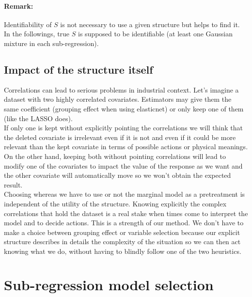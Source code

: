 \documentclass[12pt,a4paper]{report}
\begin{document}
	
\paragraph{Remark:} Identifiability of $S$ is not necessary to use a given structure but helps to find it.
In the followings, true $S$ is supposed to be identifiable (at least one Gaussian mixture in each sub-regression).
		
	\subsection{Impact of the structure itself}
		
	
	Correlations can lead to serious problems in industrial context. Let's imagine a dataset with two highly correlated covariates. Estimators may give them the same coefficient (grouping effect  when using elasticnet) or only keep one of them (like the LASSO does). \\
	
	If only one is kept without explicitly pointing the correlations we will think that the deleted covariate is irrelevant even if it is not and even if it could be more relevant than the kept covariate in terms of possible actions or physical meanings.\\
	
	 On the other hand, keeping both without pointing correlations will lead to modify one of the covariates to impact the value of the response as we want and the other covariate will automatically move so we won't obtain the expected result.\\
	 
	  Choosing whereas we have to use or not the marginal model as a pretreatment is independent of the utility of the structure. Knowing explicitly the complex correlations that hold the dataset is a real stake when times come to interpret the model and to  decide actions. This is a strength of our method. We don't have to make a choice between grouping effect or variable selection because our explicit structure describes in details the complexity of the situation so we can then act knowing what we do, without having to blindly follow one of the two heuristics.

\section{Sub-regression model selection}	
\end{document}
